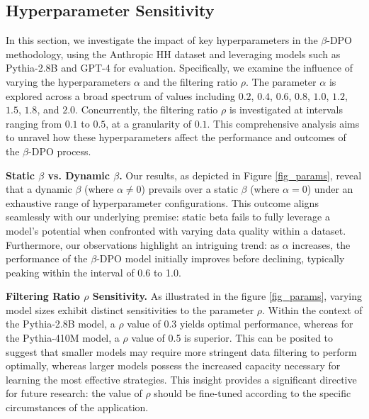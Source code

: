 \subsection{Hyperparameter Sensitivity}
In this section, we investigate the impact of key hyperparameters in the $\beta$-DPO methodology, using the Anthropic HH dataset and leveraging models such as Pythia-2.8B and GPT-4 for evaluation. Specifically, we examine the influence of varying the hyperparameters $\alpha$ and the filtering ratio $\rho$. The parameter $\alpha$ is explored across a broad spectrum of values including $0.2$, $0.4$, $0.6$, $0.8$, $1.0$, $1.2$, $1.5$, $1.8$, and $2.0$. Concurrently, the filtering ratio $\rho$ is investigated at intervals ranging from $0.1$ to $0.5$, at a granularity of $0.1$. This comprehensive analysis aims to unravel how these hyperparameters affect the performance and outcomes of the $\beta$-DPO process.

\textbf{Static $\beta$ vs. Dynamic $\beta$.}
Our results, as depicted in Figure \ref{fig_params}, reveal that a dynamic $\beta$ (where $\alpha \neq 0$) prevails over a static $\beta$ (where $\alpha = 0$) under an exhaustive range of hyperparameter configurations. 
This outcome aligns seamlessly with our underlying premise: static beta fails to fully leverage a model's potential when confronted with varying data quality within a dataset. Furthermore, our observations highlight an intriguing trend: as $\alpha$ increases, the performance of the $\beta$-DPO model initially improves before declining, typically peaking within the interval of 0.6 to 1.0. 

\textbf{Filtering Ratio $\rho$ Sensitivity.}
As illustrated in the figure \ref{fig_params}, varying model sizes exhibit distinct sensitivities to the parameter $\rho$. Within the context of the Pythia-2.8B model, a $\rho$ value of 0.3 yields optimal performance, whereas for the Pythia-410M model, a $\rho$ value of 0.5 is superior. This can be posited to suggest that smaller models may require more stringent data filtering to perform optimally, whereas larger models possess the increased capacity necessary for learning the most effective strategies. This insight provides a significant directive for future research: the value of $\rho$ should be fine-tuned according to the specific circumstances of the application.



